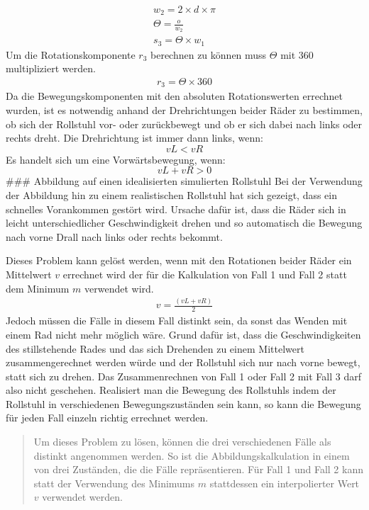 \[
\begin{align}
w_2 = 2 \times d \times π \\
Θ = \frac {o} {w_2} \\
s_3 = Θ \times w_1
\end{align}
\] Um die Rotationskomponente \(r_3\) berechnen zu können muss \(Θ\) mit
\(360\) multipliziert werden. \[
\begin{align}
r_3 = Θ \times 360
\end{align}
\] Da die Bewegungskomponenten mit den absoluten Rotationswerten
errechnet wurden, ist es notwendig anhand der Drehrichtungen beider
Räder zu bestimmen, ob sich der Rollstuhl vor- oder zurückbewegt und ob
er sich dabei nach links oder rechts dreht. Die Drehrichtung ist immer
dann links, wenn: \[
vL < vR
\] Es handelt sich um eine Vorwärtsbewegung, wenn: \[
vL + vR > 0
\] \#\#\# Abbildung auf einen idealisierten simulierten Rollstuhl Bei
der Verwendung der Abbildung hin zu einem realistischen Rollstuhl hat
sich gezeigt, dass ein schnelles Vorankommen gestört wird. Ursache dafür
ist, dass die Räder sich in leicht unterschiedlicher Geschwindigkeit
drehen und so automatisch die Bewegung nach vorne Drall nach links oder
rechts bekommt.

Dieses Problem kann gelöst werden, wenn mit den Rotationen beider Räder
ein Mittelwert \(v\) errechnet wird der für die Kalkulation von Fall 1
und Fall 2 statt dem Minimum \(m\) verwendet wird. \[
\begin{align}
v = \frac {(vL + vR)} {2} 
\end{align}
\] Jedoch müssen die Fälle in diesem Fall distinkt sein, da sonst das
Wenden mit einem Rad nicht mehr möglich wäre. Grund dafür ist, dass die
Geschwindigkeiten des stillstehende Rades und das sich Drehenden zu
einem Mittelwert zusammengerechnet werden würde und der Rollstuhl sich
nur nach vorne bewegt, statt sich zu drehen. Das Zusammenrechnen von
Fall 1 oder Fall 2 mit Fall 3 darf also nicht geschehen. Realisiert man
die Bewegung des Rollstuhls indem der Rollstuhl in verschiedenen
Bewegungszuständen sein kann, so kann die Bewegung für jeden Fall
einzeln richtig errechnet werden.

\begin{quote}
Um dieses Problem zu lösen, können die drei verschiedenen Fälle als
distinkt angenommen werden. So ist die Abbildungskalkulation in einem
von drei Zuständen, die die Fälle repräsentieren. Für Fall 1 und Fall 2
kann statt der Verwendung des Minimums \(m\) stattdessen ein
interpolierter Wert \(v\) verwendet werden.
\end{quote}


